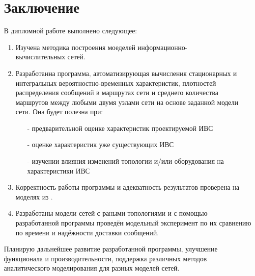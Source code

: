 \documentclass[oneside, final, 14pt, a4paper]{extreport}
\begin{document}
\chapter*{\centering Заключение}
В дипломной работе выполнено следующее:	
\begin{enumerate}
	\item Изучена методика построения моеделей информационно- \\ вычислительных сетей.
	 
	\item Разработанна программа, автоматизирующая вычисления стационарных и интегральных вероятностно-временных характеристик, плотностей распределения сообщений в маршрутах сети и среднего количества маршрутов между любыми двумя узлами сети на основе заданной модели сети.
	Она будет полезна при:
	\begin{itemize}
		\item[-] предварительной оценке характеристик проектируемой ИВС
		\item[-] оценке характеристик уже существующих ИВС
		\item[-] изучении влияния изменений топологии и/или оборудования на характеристики ИВС
	\end{itemize}
	
	\item Корректность работы программы и адекватность результатов проверена на моделях из \cite{klimanov:manual_stankin}.
	
	\item Разработаны модели сетей с раными топологиями и с помощью разработанной программы проведён модельный эксперимент по их сравнению по времени и надёжности доставки сообщений.
\end{enumerate}

Планирую дальнейшее развитие разработанной программы, улучшение функционала и производительности, поддержка различных методов аналитического моделирования для разных моделей сетей.
\end{document}
